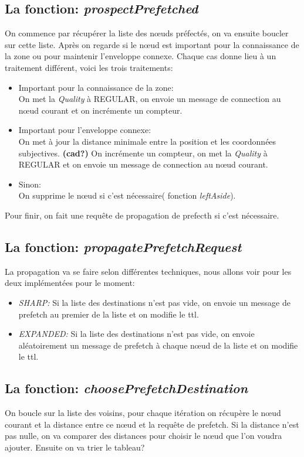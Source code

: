 \documentclass[11pt,a4paper]{article}
\begin{document}
\subsection{La fonction: \textit{prospectPrefetched}}
On commence par récupérer la liste des nœuds préfectés, on va ensuite boucler sur cette liste. Après on regarde si le nœud est important pour la connaissance de la zone ou pour maintenir l'enveloppe connexe. Chaque cas donne lieu à un traitement différent, voici les trois traitements:
\begin{itemize}
	\renewcommand{\labelitemi}{$\bullet$} 
	\item Important pour la connaissance de la zone:\\
		On met la \textit{Quality} à REGULAR, on envoie un message de connection au nœud courant et on incrémente un compteur.
	\item Important pour l'enveloppe connexe:\\
		On met à jour la distance minimale entre la position et les coordonnées subjectives. \textbf{(cad?)} On incrémente un compteur, on met la \textit{Quality} à REGULAR et on envoie un message de connection au nœud courant.
	\item Sinon:\\
		On supprime le nœud si c'est nécessaire( fonction \textit{leftAside}).
\end{itemize}
Pour finir, on fait une requête de propagation de prefecth si c'est nécessaire.

\subsection{La fonction: \textit{propagatePrefetchRequest}}
La propagation va se faire selon différentes techniques, nous allons voir pour les deux implémentées pour le moment:
\begin{itemize}
	\renewcommand{\labelitemi}{$\bullet$} 
	\item \textit{SHARP:} Si la liste des destinations n'est pas vide, on envoie un message de prefetch au premier de la liste et on modifie le ttl.
	\item \textit{EXPANDED:} Si la liste des destinations n'est pas vide, on envoie aléatoirement un message de prefetch à chaque nœud de la liste et on modifie le ttl.

\end{itemize}

\subsection{La fonction: \textit{choosePrefetchDestination}}
On boucle sur la liste des voisins, pour chaque itération on récupère le nœud courant et la distance entre ce nœud et la requête de prefetch. Si la distance n'est pas nulle, on va comparer des distances pour choisir le nœud que l'on voudra ajouter. Ensuite on va trier le tableau?
\end{document}
